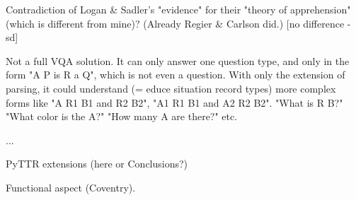 Contradiction of Logan \& Sadler's "evidence" for their "theory of apprehension" (which is different from mine)? (Already Regier \& Carlson did.)
[no difference -sd]

Not a full VQA solution.
It can only answer one question type, and only in the form "A P is R a Q", which is not even a question.
With only the extension of parsing, it could understand (= educe situation record types) more complex forms like "A R1 B1 and R2 B2", "A1 R1 B1 and A2 R2 B2".
"What is R B?"
"What color is the A?"
"How many A are there?" etc.

...

PyTTR extensions (here or Conclusions?)

Functional aspect (Coventry).
